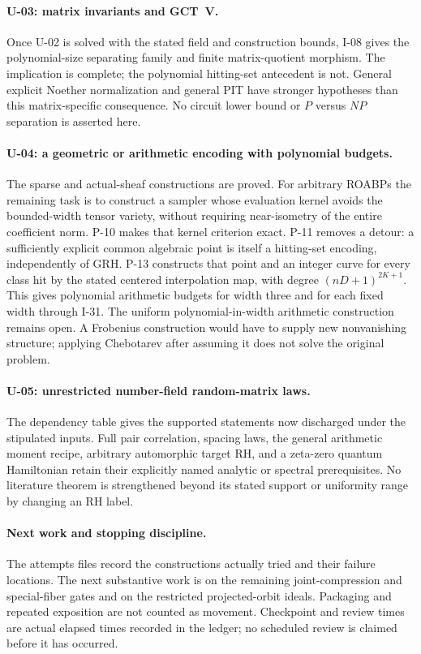 \documentclass[11pt,a4paper]{article}
\theoremstyle{definition}\newtheorem{definition}{Definition}
\begin{document}
\paragraph{U-03: matrix invariants and GCT~V.}
Once U-02 is solved with the stated field and construction bounds, I-08 gives the polynomial-size separating family and finite matrix-quotient morphism. The implication is complete; the polynomial hitting-set antecedent is not. General explicit Noether normalization and general PIT have stronger hypotheses than this matrix-specific consequence. No circuit lower bound or $P$ versus $NP$ separation is asserted here.

\paragraph{U-04: a geometric or arithmetic encoding with polynomial budgets.}
The sparse and actual-sheaf constructions are proved. For arbitrary ROABPs the remaining task is to construct a sampler whose evaluation kernel avoids the bounded-width tensor variety, without requiring near-isometry of the entire coefficient norm. P-10 makes that kernel criterion exact. P-11 removes a detour: a sufficiently explicit common algebraic point is itself a hitting-set encoding, independently of GRH. P-13 constructs that point and an integer curve for every class hit by the stated centered interpolation map, with degree $(nD+1)^{2K+1}$. This gives polynomial arithmetic budgets for width three and for each fixed width through I-31. The uniform polynomial-in-width arithmetic construction remains open. A Frobenius construction would have to supply new nonvanishing structure; applying Chebotarev after assuming it does not solve the original problem.

\paragraph{U-05: unrestricted number-field random-matrix laws.}
The dependency table gives the supported statements now discharged under the stipulated inputs. Full pair correlation, spacing laws, the general arithmetic moment recipe, arbitrary automorphic target RH, and a zeta-zero quantum Hamiltonian retain their explicitly named analytic or spectral prerequisites. No literature theorem is strengthened beyond its stated support or uniformity range by changing an RH label.

\paragraph{Next work and stopping discipline.}
The attempts files record the constructions actually tried and their failure locations. The next substantive work is on the remaining joint-compression and special-fiber gates and on the restricted projected-orbit ideals. Packaging and repeated exposition are not counted as movement. Checkpoint and review times are actual elapsed times recorded in the ledger; no scheduled review is claimed before it has occurred.
\end{document}
